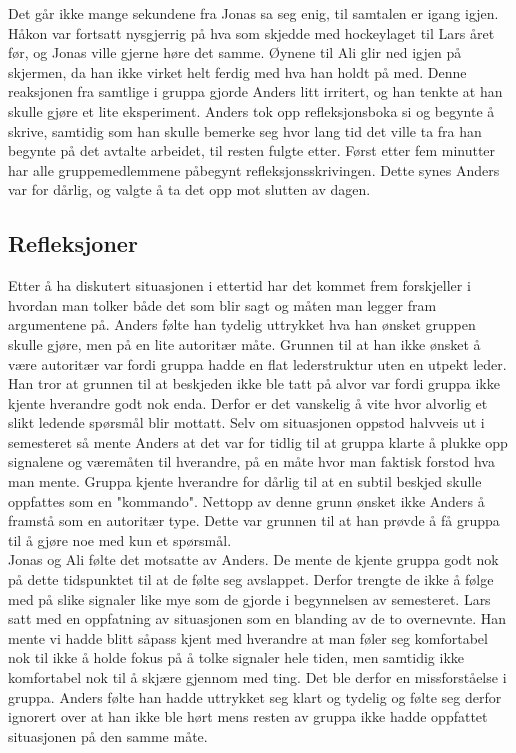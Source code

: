 Det går ikke mange sekundene fra Jonas sa seg enig, til samtalen er igang igjen. Håkon var fortsatt nysgjerrig på hva som skjedde med hockeylaget til Lars året før, og Jonas ville gjerne høre det samme. Øynene til Ali glir ned igjen på skjermen, da han ikke virket helt ferdig med hva han holdt på med. Denne reaksjonen fra samtlige i gruppa gjorde Anders litt irritert, og han tenkte at han skulle gjøre et lite eksperiment. Anders tok opp refleksjonsboka si og begynte å skrive, samtidig som han skulle bemerke seg hvor lang tid det ville ta fra han begynte på det avtalte arbeidet, til resten fulgte etter. Først etter fem minutter har alle gruppemedlemmene påbegynt refleksjonsskrivingen. Dette synes Anders var for dårlig, og valgte å ta det opp mot slutten av dagen.


\newpage


\subsection{Refleksjoner}

Etter å ha diskutert situasjonen i ettertid har det kommet frem forskjeller i hvordan man tolker både det som blir sagt og måten man legger fram argumentene på. Anders følte han tydelig uttrykket hva han ønsket gruppen skulle gjøre, men på en lite autoritær måte. Grunnen til at han ikke ønsket å være autoritær var fordi gruppa hadde en flat lederstruktur uten en utpekt leder. Han tror at grunnen til at beskjeden ikke ble tatt på alvor var fordi gruppa ikke kjente hverandre godt nok enda. Derfor er det vanskelig å vite hvor alvorlig et slikt ledende spørsmål blir mottatt. Selv om situasjonen oppstod halvveis ut i semesteret så mente Anders at det var for tidlig til at gruppa klarte å plukke opp signalene og væremåten til hverandre, på en måte hvor man faktisk forstod hva man mente. Gruppa kjente hverandre for dårlig til at en subtil beskjed skulle oppfattes som en "kommando". Nettopp av denne grunn ønsket ikke Anders å framstå som en autoritær type. Dette var grunnen til at han prøvde å få gruppa til å gjøre noe med kun et spørsmål.\\

Jonas og Ali følte det motsatte av Anders. De mente de kjente gruppa godt nok på dette tidspunktet til at de følte seg avslappet. Derfor trengte de ikke å følge med på slike signaler like mye som de gjorde i begynnelsen av semesteret. 
Lars satt med en oppfatning av situasjonen som en blanding av de to overnevnte. Han mente vi hadde blitt såpass kjent med hverandre at man føler seg komfortabel nok til ikke å holde fokus på å tolke signaler hele tiden, men samtidig ikke komfortabel nok til å skjære gjennom med ting. 
Det ble derfor en missforståelse i gruppa. Anders følte han hadde uttrykket seg klart og tydelig og følte seg derfor ignorert over at han ikke ble hørt mens resten av gruppa ikke hadde oppfattet situasjonen på den samme måte. \\

